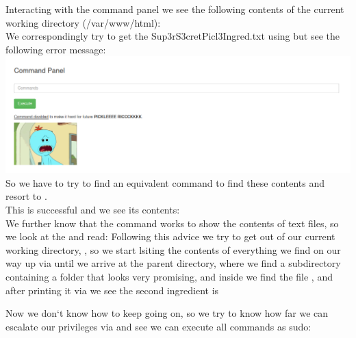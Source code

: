 Interacting with the command panel we see the following contents of the current working directory (/var/www/html):\\
We correspondingly try to get the Sup3rS3cretPicl3Ingred.txt using  but see the following error message:\\
\includegraphics[width=\textwidth]{Complete_Beginner_Path/Web_Hacking_Fundamentals_Room/PickleRick/ErrorMsg.png}
So we have to try to find an equivalent command to find these contents and resort to .\\
This is successful and we see its contents:\\
We further know that the  command works to show the contents of text files, so we look at the  and read: 
Following this advice we try to get out of our current working directory, , so we start lsiting the contents of everything we find on our way up via  until we arrive at the parent directory, where we find a  subdirectory containing a  folder that looks very promising, and inside we find the file , and after printing it via  we see the second ingredient is 

Now we don`t know how to keep going on, so we try to know how far we can escalate our privileges via  and see we can execute all commands as sudo:
    
